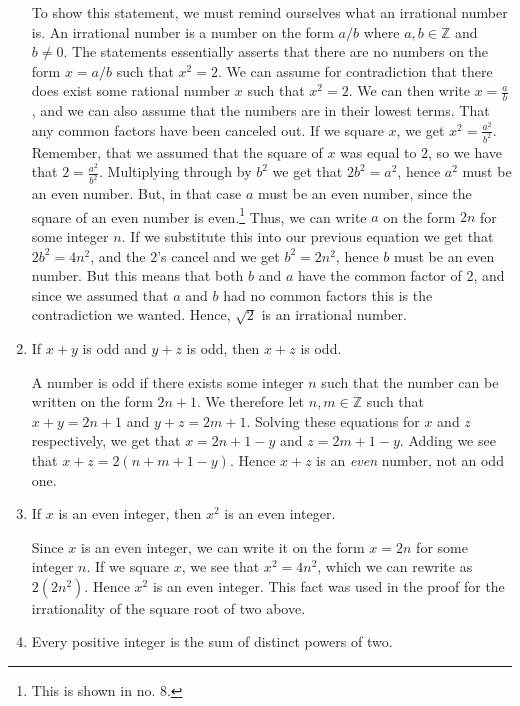 \documentclass[a4paper, 11pt]{report}
\theoremstyle{plain}
\theoremstyle{definition}
\begin{document}
\begin{enumerate}
    To show this statement, we must remind ourselves what an irrational
    number is.  An irrational number is a number on the form $a / b$ where
    $a, b \in \mathbb{Z}$ and $b \neq 0$.  The statements essentially
    asserts that there are no numbers on the form $x = a / b$ such that $x
    ^ 2 = 2$.  We can assume for contradiction that there does exist some
    rational number $x$ such that $x ^ 2 = 2$. We can then write $x =
    \frac{a}{b}$, and we can also assume that the numbers are in their
    lowest terms. That any common factors have been canceled out.  If we
    square $x$, we get $x ^ 2 = \frac{a^2}{b^2}$. Remember, that we assumed
    that the square of $x$ was equal to $2$, so we have that $2 =
    \frac{a^2}{b^2}$. Multiplying through by $b^2$ we get that $2b^2 =
    a^2$, hence $a^2$ must be an even number. But, in that case $a$ must be
    an even number, since the square of an even number is
    even.\footnote{This is shown in no. 8.} Thus, we can write $a$ on the
    form $2n$ for some integer $n$. If we substitute this into our previous
    equation we get that $2b^2 = 4n^2$, and the $2$'s cancel and we get
    $b^2 = 2n^2$, hence $b$ must be an even number. But this means that
    both $b$ and $a$ have the common factor of $2$, and since we assumed
    that $a$ and $b$ had no common factors this is the contradiction we
    wanted. Hence, $\sqrt{2}$ is an irrational number.

  \item If $x + y$ is odd and $y + z$ is odd, then $x + z$ is odd.

    A number is odd if there exists some integer $n$ such that the number
    can be written on the form $2n + 1$. We therefore let $n, m \in
    \mathbb{Z}$ such that $x + y = 2n + 1$ and $y + z = 2m + 1$. Solving
    these equations for $x$ and $z$ respectively, we get that $x = 2n + 1 -
    y$ and $z = 2m + 1 - y$. Adding we see that $x + z = 2(n + m + 1 - y)$.
    Hence $x + z$ is an \textit{even} number, not an odd one.

  \item If $x$ is an even integer, then $x^2$ is an even integer. 

    Since $x$ is an even integer, we can write it on the form $x = 2n$ for
    some integer $n$. If we square $x$, we see that $x^2 = 4n^2$, which we
    can rewrite as $2(2n^2)$. Hence $x^2$ is an even integer. This fact was
    used in the proof for the irrationality of the square root of two
    above.

  \item Every positive integer is the sum of distinct powers of two.


\end{enumerate}
\end{document}
